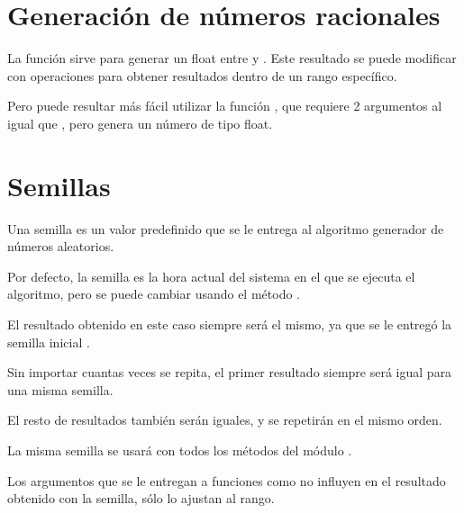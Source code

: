 
\section{Generación de números racionales}

La función  sirve para generar un float entre  y . Este resultado se puede modificar con operaciones para obtener resultados dentro de un rango específico.\smallskip


Pero puede resultar más fácil utilizar la función , que requiere 2 argumentos al igual que , pero genera un número de tipo float.


\section{Semillas}

Una semilla es un valor predefinido que se le entrega al algoritmo generador de números aleatorios.\smallskip

Por defecto, la semilla es la hora actual del sistema en el que se ejecuta el algoritmo, pero se puede cambiar usando el método .


El resultado obtenido en este caso siempre será el mismo, ya que se le entregó la semilla inicial .\smallskip

Sin importar cuantas veces se repita, el primer resultado siempre será igual para una misma semilla.


El resto de resultados también serán iguales, y se repetirán en el mismo orden.


La misma semilla se usará con todos los métodos del módulo .\smallskip

Los argumentos que se le entregan a funciones como  no influyen en el resultado obtenido con la semilla, sólo lo ajustan al rango.

